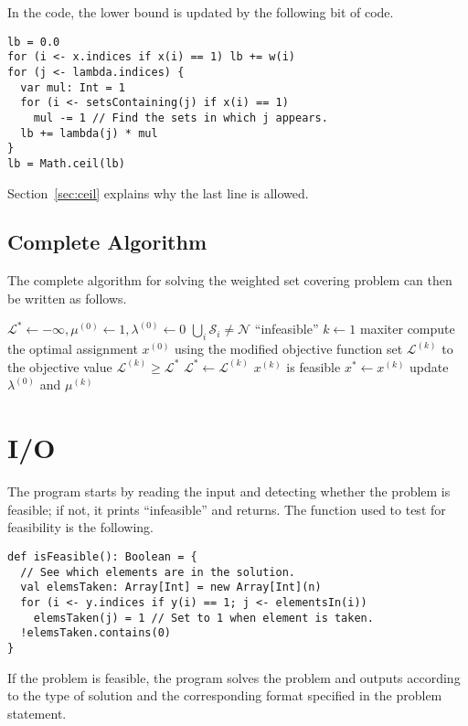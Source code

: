 \documentclass[journal]{IEEEtran}
\newcommand{\lagr}{\mathscr{L}}
\begin{document}
In the code, the lower bound is updated by the following bit of code.
\begin{verbatim}
lb = 0.0
for (i <- x.indices if x(i) == 1) lb += w(i)
for (j <- lambda.indices) {
  var mul: Int = 1
  for (i <- setsContaining(j) if x(i) == 1)
    mul -= 1 // Find the sets in which j appears.
  lb += lambda(j) * mul
}
lb = Math.ceil(lb)
\end{verbatim}
Section~\ref{sec:ceil} explains why the last line is allowed.

\subsection{Complete Algorithm}
The complete algorithm for solving the weighted set covering problem can then be written as follows.
\begin{codebox}
	\li \(\lagr^* \gets -\infty, \mu^{(0)} \gets 1, \lambda^{(0)} \gets 0\)
	\li \If \(\bigcup_i \mathcal{S}_i \ne \mathscr{N}\)
	\li 	\Then \Return ``infeasible''
	\End
	\li \For \(k \gets 1\) \To maxiter \Do
	\li 	compute the optimal assignment \(x^{(0)}\) \Indentmore
	\zi 		using the modified objective function \End
	\li 	set \(\lagr^{(k)}\) to the objective value
	\li 	\If \(\lagr^{(k)} \ge \lagr^*\)
	\li 		\Then
	\(\lagr^* \gets \lagr^{(k)}\)
	\li			\If \(x^{(k)}\) is feasible
	\li 				\Then
	\(x^* \gets x^{(k)}\)
	\End
	\End
	\li 	update \(\lambda^{(0)}\) and \(\mu^{(k)}\)
	\End
\end{codebox}

\section{I/O}
The program starts by reading the input and detecting whether the problem is feasible; if not, it prints ``infeasible'' and returns.
The function used to test for feasibility is the following.

\begin{verbatim}
def isFeasible(): Boolean = {
  // See which elements are in the solution.
  val elemsTaken: Array[Int] = new Array[Int](n)
  for (i <- y.indices if y(i) == 1; j <- elementsIn(i))
    elemsTaken(j) = 1 // Set to 1 when element is taken.
  !elemsTaken.contains(0)
}
\end{verbatim}

If the problem is feasible, the program solves the problem and outputs according to the type of solution and the corresponding format specified in the problem statement.
\end{document}

